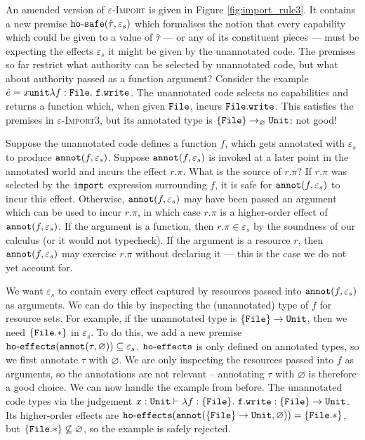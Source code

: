 An amended version of \textsc{$\varepsilon$-Import} is given in Figure
\ref{fig:import_rule3}. It contains a new premise
$\mathtt{ho \hbox{-} safe}(\hat \tau, \varepsilon_s)$ which formalises the notion that
every capability which could be given to a value of $\hat \tau$ --- or
any of its constituent pieces --- must be expecting the effects
$\varepsilon_s$ it might be given by the unannotated code.
The premises so far restrict what authority can be selected by
unannotated code, but what about authority passed as a function
argument? Consider the example
$\hat e = {x}{\mathtt{unit}}{\lambda f: { \mathtt{File}
  }.~\mathtt{f.write}}$. The unannotated code selects no capabilities and
returns a function which, when given $\mathtt{File}$, incurs
$\mathtt{File.write}$. This satisfies the premises in
\textsc{$\varepsilon$-Import3}, but its annotated type is
$\{ \mathtt{File} \} \rightarrow_{\varnothing} \mathtt{Unit}$: not good!

Suppose the unannotated code defines a function $f$, which gets
annotated with $\varepsilon_s$ to produce
$\mathtt{annot}(f, \varepsilon_s)$. Suppose $\mathtt{annot}(f, \varepsilon_s)$ is
invoked at a later point in the annotated world and incurs the effect
$r.\pi$. What is the source of $r.\pi$? If $r.\pi$ was selected by the
$\mathtt{import}$ expression surrounding $f$, it is safe for
$\mathtt{annot}(f, \varepsilon_s)$ to incur this effect. Otherwise,
$\mathtt{annot}(f, \varepsilon_s)$ may have been passed an argument which can
be used to incur $r.\pi$, in which case $r.\pi$ is a higher-order
effect of $\mathtt{annot}(f, \varepsilon_s)$. If the argument is a function,
then $r.\pi \in \varepsilon_s$ by the soundness of our calculus (or it
would not typecheck). If the argument is a resource $r$, then
$\mathtt{annot}(f, \varepsilon_s)$ may exercise $r.\pi$ without declaring it
--- this is the case we do not yet account for.

We want $\varepsilon_s$ to contain every effect captured by resources
passed into $\mathtt{annot}(f, \varepsilon_s)$ as arguments. We can do this by
inspecting the (unannotated) type of $f$ for resource sets. For
example, if the unannotated type is
$\mathtt{ \{ File \} \rightarrow \mathtt{Unit}}$, then we need
$\mathtt{ \{ File.* \} }$ in $\varepsilon_s$. To do this, we add a new
premise $\mathtt{ho \hbox{-} effects}(\mathtt{annot}(\tau, \varnothing)) \subseteq
\varepsilon_s$. $\mathtt{ho \hbox{-} effects}$ is only defined on
annotated types, so we first annotate $\tau$ with $\varnothing$. We
are only inspecting the resources passed into $f$ as arguments, so the
annotations are not relevant -- annotating $\tau$ with $\varnothing$
is therefore a good choice. We can now handle the example from
before. The unannotated code types via the judgement
$x: \mathtt{Unit} \vdash \lambda f: \{ \mathtt{File} \}.~\mathtt{f.write}: \{ \mathtt{File} \}
\rightarrow \mathtt{Unit}$. Its higher-order effects are
$\mathtt{ho \hbox{-} effects}(\mathtt{annot}( \{ \mathtt{File} \} \rightarrow \mathtt{Unit}, \varnothing)) = \{
\mathtt{File.*} \}$, but $\{ \mathtt{File.*} \} \not\subseteq \varnothing$,
so the example is safely rejected.

